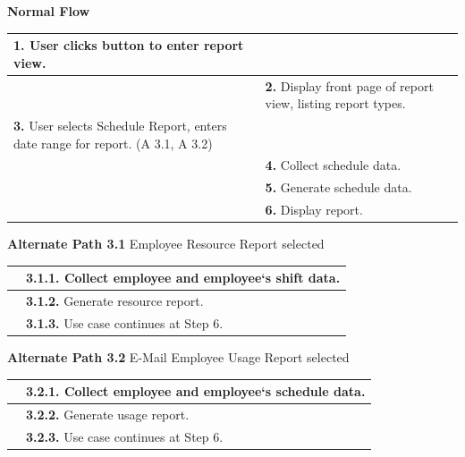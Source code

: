 \documentclass[letterpaper,12pt]{report}
\begin{document}
{ \centering \textbf{Normal Flow}
\begin{center}
\xuchead
\begin{tabular}{| p{8.5cm} | p{8.5cm} |}
\hline
\textbf{1.} User clicks button to enter report view. & \\
\hline
& \textbf{2.} Display front page of report view, listing report types. \\
\hline
\textbf{3.} User selects Schedule Report, enters date range for report. (A 3.1, A 3.2) & \\
\hline
& \textbf{4.} Collect schedule data. \\
\hline
& \textbf{5.} Generate schedule data. \\
\hline
& \textbf{6.} Display report. \\
\hline
\end{tabular}
\end{center}
\pagebreak
\centering \textbf{Alternate Path 3.1}
\linebreak Employee Resource Report selected
\begin{center}
\xuchead
\begin{tabular}{| p{8.5cm} | p{8.5cm} |}
\hline
& \textbf{3.1.1.} Collect employee and employee`s shift data. \\
\hline
& \textbf{3.1.2.} Generate resource report. \\
\hline
& \textbf{3.1.3.} Use case\index{Use Case} continues at Step 6. \\
\hline
\end{tabular}
\end{center}

\centering \textbf{Alternate Path 3.2}
\linebreak E-Mail Employee Usage Report selected
\begin{center}
\xuchead
\begin{tabular}{| p{8.5cm} | p{8.5cm} |}
\hline
& \textbf{3.2.1.} Collect employee and employee`s schedule data. \\
\hline
& \textbf{3.2.2.} Generate usage report. \\
\hline
& \textbf{3.2.3.} Use case\index{Use Case} continues at Step 6. \\
\hline
\end{tabular}
\end{center}

}

\pagebreak
\end{document}

